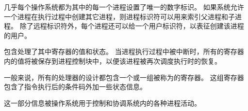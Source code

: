 {{        
        {
            几乎每个操作系统都为其中的每一个进程设置了唯一的数字标识。
            如果系统允许一个进程在执行过程中创建其它进程，则进程标识符可以用来索引父进程和子进程。
            除了远程标识符外，每个进程还可以给一个用户标识符，以表征创建该进程的用户。
        }

        {
            包含处理了其中寄存器的值和状态。
            当进程执行过程中被中断时，所有的寄存器内的值将被保存到进程控制块中，以便该进程被再次调度执行时的恢复。

            一般来说，所有的处理器的设计都包含一个或一组被称为的寄存器。
            这组寄存器包含了指令执行后的条件码外加一些状态信息。
        }

        {
            这一部分信息被操作系统用于控制和协调系统内的各种进程活动。
        }
    }
}
